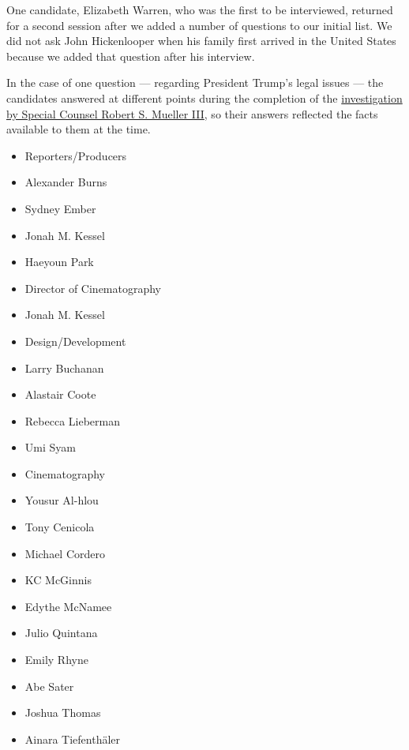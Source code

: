 One candidate, Elizabeth Warren, who was the first to be interviewed,
returned for a second session after we added a number of questions to
our initial list. We did not ask John Hickenlooper when his family first
arrived in the United States because we added that question after his
interview.

In the case of one question --- regarding President Trump's legal issues
--- the candidates answered at different points during the completion of
the
\href{https://www.nytimes.com/2019/04/18/us/politics/mueller-report-russian-interference-donald-trump.html?module=inline}{investigation
by Special Counsel Robert S. Mueller III}, so their answers reflected
the facts available to them at the time.

\begin{itemize}
\tightlist
\item
  Reporters/Producers
\item
  Alexander Burns
\item
  Sydney Ember
\item
  Jonah M. Kessel
\item
  Haeyoun Park
\end{itemize}

\begin{itemize}
\tightlist
\item
  Director of Cinematography
\item
  Jonah M. Kessel
\end{itemize}

\begin{itemize}
\tightlist
\item
  Design/Development
\item
  Larry Buchanan
\item
  Alastair Coote
\item
  Rebecca Lieberman
\item
  Umi Syam
\end{itemize}

\begin{itemize}
\tightlist
\item
  Cinematography
\item
  Yousur Al-hlou
\item
  Tony Cenicola
\item
  Michael Cordero
\item
  KC McGinnis
\item
  Edythe McNamee
\item
  Julio Quintana
\item
  Emily Rhyne
\item
  Abe Sater
\item
  Joshua Thomas
\item
  Ainara Tiefenthäler
\end{itemize}

